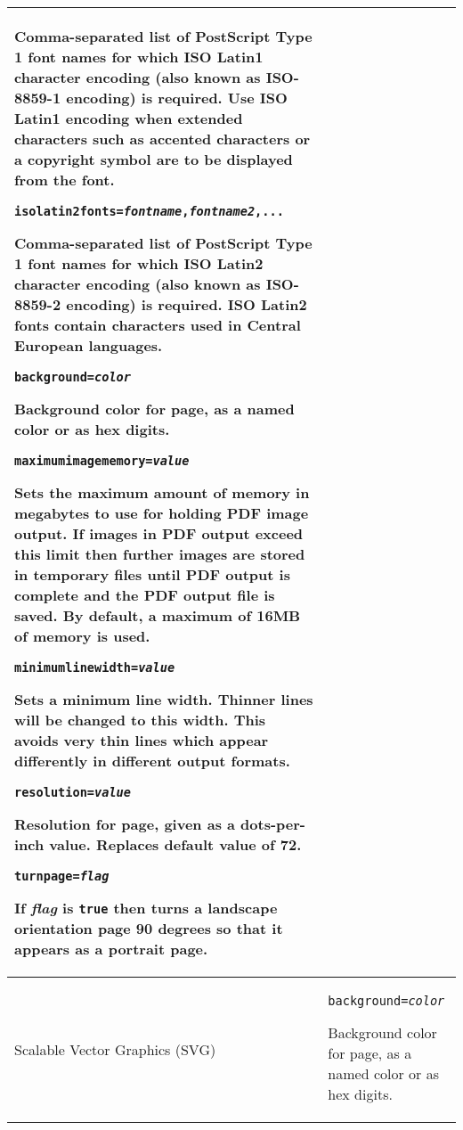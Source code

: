 \begin{longtable}{|p{4cm}|p{10cm}|}
Comma-separated list of PostScript Type 1 font names for
which ISO Latin1 character encoding
(also known as ISO-8859-1 encoding)
is required.  Use ISO Latin1 encoding
when extended characters such as accented characters
or a copyright symbol are to be displayed from the font.

\vspace{10pt}
\texttt{isolatin2fonts=\textit{fontname},\textit{fontname2},...}

Comma-separated list of PostScript Type 1 font names for
which ISO Latin2 character encoding
(also known as ISO-8859-2 encoding)
is required.  ISO Latin2 fonts contain characters used in
Central European languages.

\vspace{10pt}
\texttt{background=\textit{color}}

Background color for page, as a named color or as hex digits.

\vspace{10pt}
\texttt{maximumimagememory=\textit{value}}

Sets the maximum amount of memory in megabytes
to use for holding PDF image output.  If images in PDF output
exceed this limit then further images are stored in temporary files
until PDF output is complete and the PDF output file is saved.
By default, a maximum of 16MB of memory is used.

\vspace{10pt}
\texttt{minimumlinewidth=\textit{value}}

Sets a minimum line width.  Thinner lines will be changed to
this width.  This avoids very thin lines which appear differently
in different output formats.

\vspace{10pt}
\texttt{resolution=\textit{value}}

Resolution for page, given as a dots-per-inch value.  Replaces
default value of 72.

\vspace{10pt}
\texttt{turnpage=\textit{flag}}

If \textit{flag} is \texttt{true} then
turns a landscape orientation page 90 degrees so that it appears
as a portrait page. \\

\hline

Scalable Vector Graphics (SVG) &

\texttt{background=\textit{color}}

Background color for page, as a named color or as hex digits.


\end{longtable}
